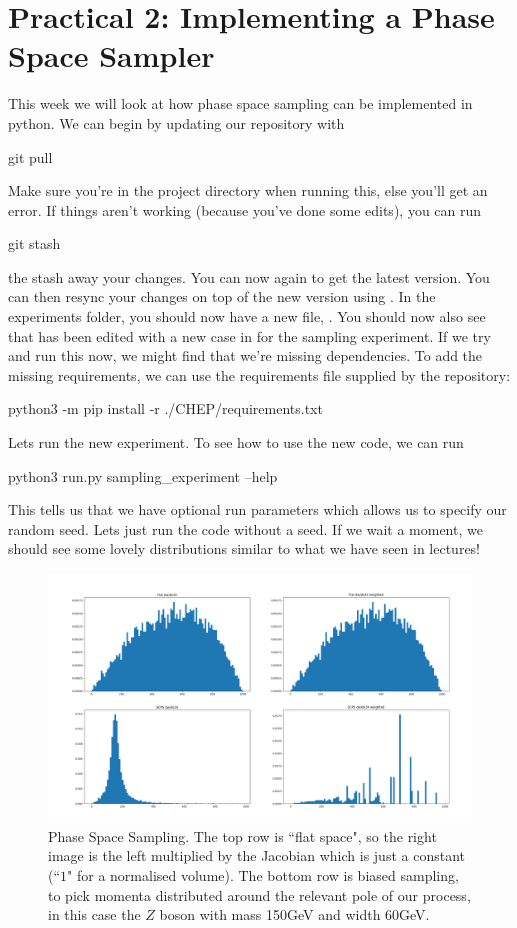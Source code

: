\section*{Practical 2: Implementing a Phase Space Sampler}

This week we will look at how phase space sampling can be implemented in python. We can begin by updating our repository with 
\begin{codeenv}
    git pull
\end{codeenv}
Make sure you're in the project directory when running this, else you'll get an error. If things aren't working (because you've done some edits), you can run
\begin{codeenv}
    git stash
\end{codeenv}
the stash away your changes. You can now  again to get the latest version. You can then resync your changes on top of the new version using .
In the experiments folder, you should now have a new file, .
You should now also see that  has been edited with a new case in  for the sampling experiment. If we try and run this now, we might find that we're missing dependencies. To add the missing requirements, we can use the requirements file supplied by the repository:
\begin{codeenv}
    python3 -m pip install -r ./CHEP/requirements.txt
\end{codeenv}
Lets run the new experiment. To see how to use the new code, we can run
\begin{codeenv}
    python3 run.py sampling_experiment --help
\end{codeenv}
This tells us that we have optional run parameters which allows us to specify our random seed. Lets just run the code without a seed. If we wait a moment, we should see some lovely distributions similar to what we have seen in lectures!

\begin{figure}[H]
    \centering
    \includegraphics[width=0.75\linewidth]{tex/ims/phasespace1.png}
    \caption{Phase Space Sampling. The top row is ``flat space", so the right image is the left multiplied by the Jacobian which is just a constant (``$1$" for a normalised volume). The bottom row is biased sampling, to pick momenta distributed around the relevant pole of our process, in this case the $Z$ boson with mass 150GeV and width 60GeV.}
    \label{fig:enter-label}
\end{figure}


